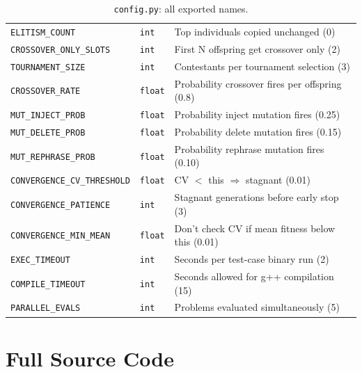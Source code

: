 \documentclass[11pt,a4paper]{report}
\newcommand{\pyfile}[1]{\texttt{#1}}
\newcommand{\fn}[1]{\texttt{#1}}
\begin{document}
\begin{table}[h]
\begin{tabular}{@{}llp{7cm}@{}}
\fn{ELITISM\_COUNT}          & \texttt{int}   & Top individuals copied unchanged (0) \\
\fn{CROSSOVER\_ONLY\_SLOTS}  & \texttt{int}   & First N offspring get crossover only (2) \\
\fn{TOURNAMENT\_SIZE}        & \texttt{int}   & Contestants per tournament selection (3) \\
\fn{CROSSOVER\_RATE}         & \texttt{float} & Probability crossover fires per offspring (0.8) \\
\fn{MUT\_INJECT\_PROB}       & \texttt{float} & Probability inject mutation fires (0.25) \\
\fn{MUT\_DELETE\_PROB}       & \texttt{float} & Probability delete mutation fires (0.15) \\
\fn{MUT\_REPHRASE\_PROB}     & \texttt{float} & Probability rephrase mutation fires (0.10) \\
\fn{CONVERGENCE\_CV\_THRESHOLD} & \texttt{float} & CV $<$ this $\Rightarrow$ stagnant (0.01) \\
\fn{CONVERGENCE\_PATIENCE}   & \texttt{int}   & Stagnant generations before early stop (3) \\
\fn{CONVERGENCE\_MIN\_MEAN}  & \texttt{float} & Don't check CV if mean fitness below this (0.01) \\
\fn{EXEC\_TIMEOUT}           & \texttt{int}   & Seconds per test-case binary run (2) \\
\fn{COMPILE\_TIMEOUT}        & \texttt{int}   & Seconds allowed for g++ compilation (15) \\
\fn{PARALLEL\_EVALS}         & \texttt{int}   & Problems evaluated simultaneously (5) \\
\bottomrule
\end{tabular}
\caption{\pyfile{config.py}: all exported names.}
\end{table}

\section{Full Source Code}
\end{document}
